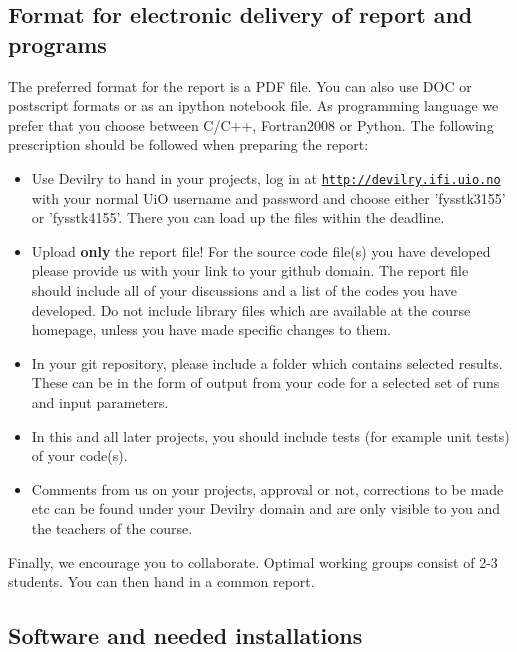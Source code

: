 \documentclass[%
oneside,                 %
final,                   %
10pt]{article}
\begin{document}
\noindent
\subsection{Format for electronic delivery of report and programs}

The preferred format for the report is a PDF file. You can also use DOC or postscript formats or as an ipython notebook file.  As programming language we prefer that you choose between C/C++, Fortran2008 or Python. The following prescription should be followed when preparing the report:

\begin{itemize}
  \item Use Devilry to hand in your projects, log in  at  \href{{http://devilry.ifi.uio.no}}{\nolinkurl{http://devilry.ifi.uio.no}} with your normal UiO username and password and choose either 'fysstk3155' or 'fysstk4155'. There you can load up the files within the deadline.

  \item Upload \textbf{only} the report file!  For the source code file(s) you have developed please provide us with your link to your github domain.  The report file should include all of your discussions and a list of the codes you have developed.  Do not include library files which are available at the course homepage, unless you have made specific changes to them.

  \item In your git repository, please include a folder which contains selected results. These can be in the form of output from your code for a selected set of runs and input parameters.

  \item In this and all later projects, you should include tests (for example unit tests) of your code(s).

  \item Comments  from us on your projects, approval or not, corrections to be made  etc can be found under your Devilry domain and are only visible to you and the teachers of the course.
\end{itemize}

\noindent
Finally, 
we encourage you to collaborate. Optimal working groups consist of 
2-3 students. You can then hand in a common report. 



\subsection{Software and needed installations}
\end{document}

